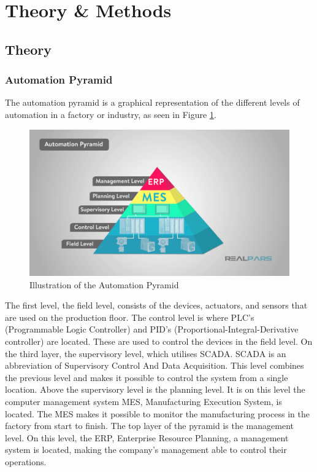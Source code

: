 \section{Theory \& Methods}
\subsection{Theory}
\subsubsection{Automation Pyramid}
The automation pyramid is a graphical representation of the different levels of
automation in a factory or industry, as seen in Figure \ref{figure:ap}.

\begin{figure}[ht]
	\centering 
	\includegraphics[width=1\linewidth]{images/automation_pyramid}
	\caption{Illustration of the Automation Pyramid}
	\label{figure:ap}
\end{figure}


The first level, the field level, consists of the devices, actuators, and
sensors that are used on the production floor. The control level is where PLC's
(Programmable Logic Controller) and PID's (Proportional-Integral-Derivative
controller) are located. These are used to control the devices in the field
level. On the third layer, the supervisory level, which utilises SCADA. SCADA
is an abbreviation of Supervisory Control And Data Acquisition. This level
combines the previous level and makes it possible to control the system from
a single location. Above the supervisory level is the planning level. It is on
this level the computer management system MES, Manufacturing Execution System,
is located. The MES makes it possible to monitor the manufacturing process in
the factory from start to finish. The top layer of the pyramid is the management
level. On this level, the ERP, Enterprise Resource Planning, a management system
is located, making the company's management able to control their operations. \cite{ap}\\

